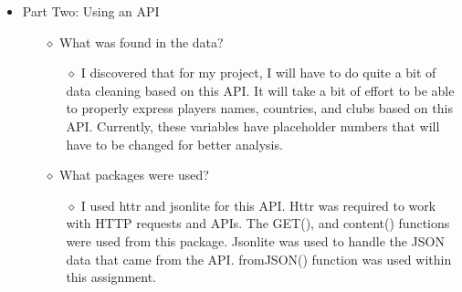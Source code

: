 \documentclass[12pt,letterpaper]{article}
\begin{document}
\begin{itemize}
    \item Part Two: Using an API
     \begin{itemize}
            \item[$\diamond$] What was found in the data?
                \begin{itemize}
                     \item[$\diamond$] I discovered that for my project, I will have to do quite a bit of data cleaning based on this API.  It will take a bit of effort to be able to properly express players names, countries, and clubs based on this API. Currently, these variables have placeholder numbers that will have to be changed for better analysis. 
                \end{itemize}
        \end{itemize}
     \begin{itemize}
    \item[$\diamond$] What packages were used?
        \begin{itemize}
            \item[$\diamond$] I used httr and jsonlite for this API. Httr was required to work with HTTP requests and APIs. The GET(), and content() functions were used from this package. Jsonlite was used to handle the JSON data that came from the API. fromJSON() function was used within this assignment. 
        \end{itemize}
        \end{itemize}
        
\end{itemize}
\end{document}
